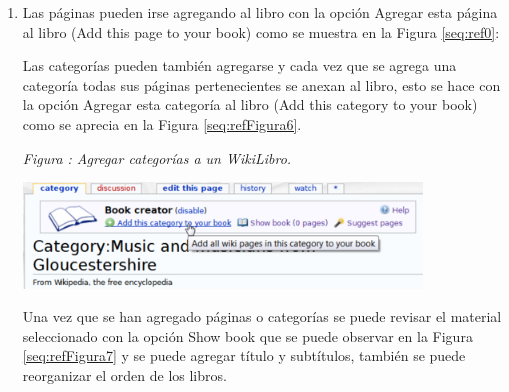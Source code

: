 \documentclass[letterpaper]{article}
\newcounter{saveenum}
\newcommand\liststyleLxxi{%
\renewcommand\theenumi{\arabic{enumi}}
\renewcommand\theenumii{\arabic{enumii}}
\renewcommand\theenumiii{\arabic{enumiii}}
\renewcommand\theenumiv{\arabic{enumiv}}
\renewcommand\labelenumi{\theenumi.}
\renewcommand\labelenumii{\theenumii.}
\renewcommand\labelenumiii{\theenumiii.}
\renewcommand\labelenumiv{\theenumiv.}
}
\newcounter{Figura}
\renewcommand\theFigura{\arabic{Figura}}
\begin{document}
\bigskip

\liststyleLxxi
\setcounter{saveenum}{\value{enumi}}
\begin{enumerate}
\setcounter{enumi}{\value{saveenum}}
\item {\sffamily
Las p\'aginas pueden irse agregando al libro con la opci\'on Agregar
esta p\'agina al libro (Add this page to your book) como se muestra en
la Figura \ref{seq:ref0}:}

{\sffamily
Las categor\'ias pueden tambi\'en agregarse y cada vez que se agrega una
categor\'ia todas sus p\'aginas pertenecientes se anexan al libro, esto
se hace con la opci\'on Agregar esta categor\'ia al libro (Add this
category to your book) como se aprecia en la Figura
\ref{seq:refFigura6}.}



\begin{center}
\begin{minipage}{10.583cm}
{\centering{}\itshape
Figura {\theFigura\label{seq:refFigura6}}:
Agregar categor\'ias a un WikiLibro.
\par}
\includegraphics[width=10.583cm,height=2.815cm]{Capitulo2-img14.png}\end{minipage}
\end{center}
{\sffamily
Una vez que se han agregado p\'aginas o categor\'ias se puede revisar el
material seleccionado con la opci\'on Show book que se puede observar
en la Figura \ref{seq:refFigura7} y se puede agregar t\'itulo y
subt\'itulos, tambi\'en se puede reorganizar el orden de los libros.}


\bigskip
\end{enumerate}
\end{document}
